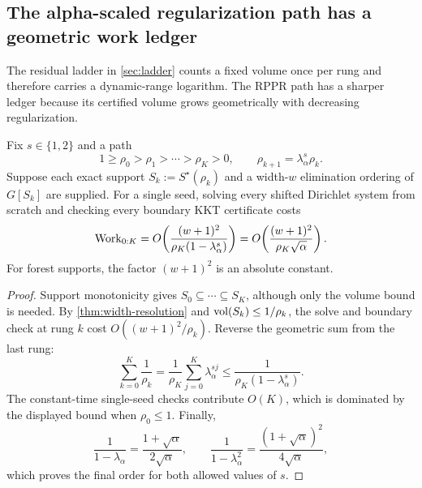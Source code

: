 \subsection{The alpha-scaled regularization path has a geometric work ledger}

The residual ladder in \cref{sec:ladder} counts a fixed volume once per rung
and therefore carries a dynamic-range logarithm.  The RPPR path has a sharper
ledger because its certified volume grows geometrically with decreasing
regularization.

\begin{theorem}
\label{thm:support-path-ledger}
Fix $s\in\{1,2\}$ and a path
\begin{equation}
 1\geq\rho_0>\rho_1>\cdots>\rho_K>0,
 \qquad
 \rho_{k+1}=\lambda_\alpha^s\rho_k.
 \label{eq:regularization-ladder}
\end{equation}
Suppose each exact support $S_k:=S^\star(\rho_k)$ and a width-$w$
elimination ordering of $G[S_k]$ are supplied.  For a single seed, solving
every shifted Dirichlet system from scratch and checking every boundary KKT
certificate costs
\begin{equation}
 \operatorname{Work}_{0:K}
 =O\!\left(
  \frac{(w+1)^2}{\rho_K(1-\lambda_\alpha^s)}
 \right)
 =O\!\left(
  \frac{(w+1)^2}{\rho_K\sqrt\alpha}
 \right).
 \label{eq:support-path-work}
\end{equation}
For forest supports, the factor $(w+1)^2$ is an absolute constant.
\end{theorem}

\begin{proof}
Support monotonicity gives $S_0\subseteq\cdots\subseteq S_K$, although only
the volume bound is needed.  By \cref{thm:width-resolution} and
$\operatorname{vol}(S_k)\leq1/\rho_k$, the solve and boundary check at rung $k$ cost
$O((w+1)^2/\rho_k)$.  Reverse the geometric sum from the last rung:
\begin{equation}
 \sum_{k=0}^K\frac1{\rho_k}
 =\frac1{\rho_K}\sum_{j=0}^K\lambda_\alpha^{sj}
 \leq\frac1{\rho_K(1-\lambda_\alpha^s)}.
 \label{eq:regularization-volume-sum}
\end{equation}
The constant-time single-seed checks contribute $O(K)$, which is dominated
by the displayed bound when $\rho_0\leq1$.  Finally,
\begin{equation}
 \frac1{1-\lambda_\alpha}
 =\frac{1+\sqrt\alpha}{2\sqrt\alpha},
 \qquad
 \frac1{1-\lambda_\alpha^2}
 =\frac{(1+\sqrt\alpha)^2}{4\sqrt\alpha},
 \label{eq:path-ledger-factor}
\end{equation}
which proves the final order for both allowed values of $s$.
\end{proof}

